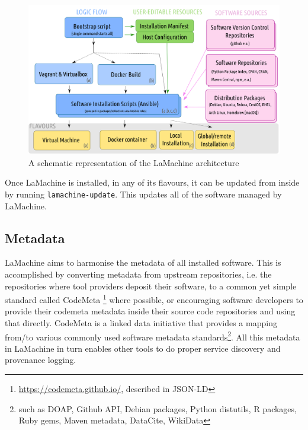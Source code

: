 \documentclass[a4paper,11pt]{article}
\begin{document}
\begin{figure}[htb] \begin{center}
\includegraphics[width=135.0mm]{architecture.png}
\end{center}
\caption{\footnotesize{A schematic representation of the LaMachine architecture}}
\label{fig:arch}
\end{figure}

Once LaMachine is installed, in any of its flavours, it can be updated from inside by running
\texttt{lamachine-update}. This updates all of the software managed by LaMachine.

\subsection{Metadata}
\label{sec:metadata}

LaMachine aims to harmonise the metadata of all installed software. This is accomplished by converting metadata from upstream repositories,
i.e. the repositories where tool providers deposit their software, to a common yet simple standard called CodeMeta
\footnote{\url{https://codemeta.github.io/}, described in JSON-LD} \cite{codemeta,codemetar} where possible, or
encouraging software developers to provide their codemeta metadata inside their source code repositories and using that
directly. CodeMeta is a linked data initiative that provides a mapping from/to various commonly used software metadata
standards\footnote{such as DOAP, Github API, Debian packages, Python distutils, R packages, Ruby gems, Maven metadata, DataCite, WikiData}.
All this metadata in LaMachine in turn enables other tools to do proper service discovery and provenance logging.
\end{document}
